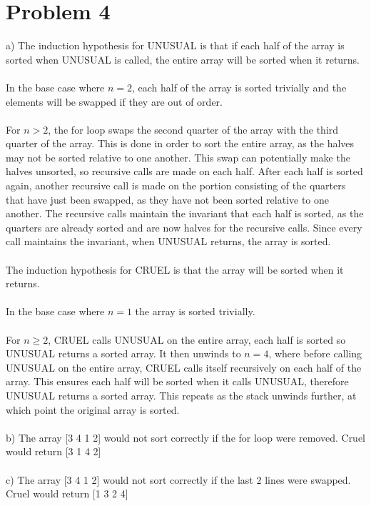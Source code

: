 \documentclass{article}
\begin{document}
\section*{Problem 4}
a) The induction hypothesis for UNUSUAL is that if each half of the array is sorted when UNUSUAL is called, the entire array will be sorted when it returns.\\\\
In the base case where $n=2$, each half of the array is sorted trivially and the elements will be swapped if they are out of order.\\\\
For $n>2$, the for loop swaps the second quarter of the array with the third quarter of the array. This is done in order to sort the entire array, as the halves may not be sorted relative to one another. This swap can potentially make the halves unsorted, so recursive calls are made on each half.  After each half is sorted again, another recursive call is made on the portion consisting of the quarters that have just been swapped, as they have not been sorted relative to one another. The recursive calls maintain the invariant that each half is sorted, as the quarters are already sorted and are now halves for the recursive calls.  Since every call maintains the invariant, when UNUSUAL returns, the array is sorted.\\\\
The induction hypothesis for CRUEL is that the array will be sorted when it returns.\\\\
In the base case where $n=1$ the array is sorted trivially.\\\\
For $n \geq 2$, CRUEL calls UNUSUAL on the entire array, each half is sorted so UNUSUAL returns a sorted array.  It then unwinds to $n=4$, where before calling UNUSUAL on the entire array, CRUEL calls itself recursively on each half of the array. This ensures each half will be sorted when it calls UNUSUAL, therefore UNUSUAL returns a sorted array.  This repeats as the stack unwinds further, at which point the original array is sorted.\\\\
b) The array [3 4 1 2] would not sort correctly if the for loop were removed.  Cruel would return [3 1 4 2]\\\\
c) The array [3 4 1 2] would not sort correctly if the last 2 lines were swapped.  Cruel would return [1 3 2 4]\\\\\\
\end{document}
